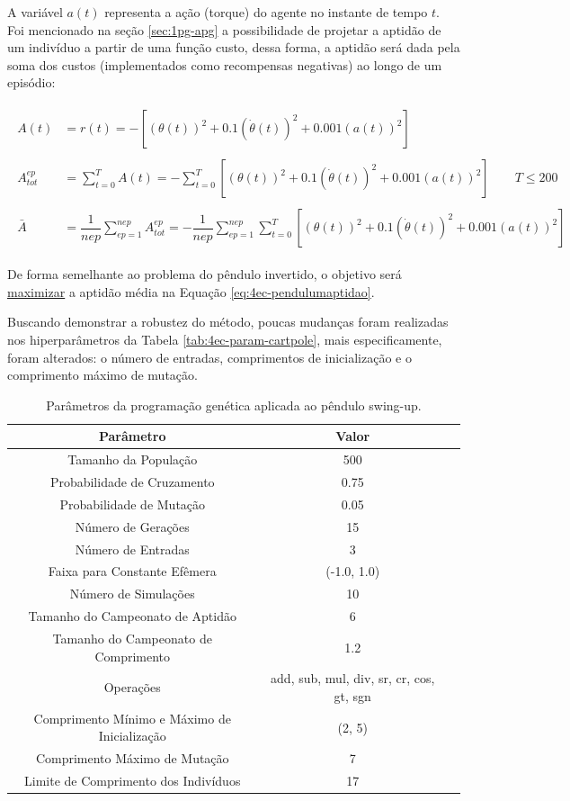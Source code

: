 A variável $a(t)$ representa a ação (torque) do agente no instante de tempo $t$. Foi mencionado na seção \ref{sec:1pg-apg} a possibilidade de projetar a aptidão de um indivíduo a partir de uma função custo, dessa forma, a aptidão será dada pela soma dos custos (implementados como recompensas negativas) ao longo de um episódio:

\begin{align}\label{eq:4ec-pendulumaptidao}
	\begin{split}
		A(t) &= r(t) = - \left[(\theta(t))^2 + 0.1(\dot\theta(t))^2+0.001(a(t))^2\right]\\\\
		A_{tot}^{ep} &= \sum_{t=0}^{T} A(t) = - \sum_{t=0}^{T} \left[
		(\theta(t))^2 + 0.1(\dot\theta(t))^2+0.001(a(t))^2
		\right]\qquad T \le 200\\\\
		\bar{A} &= \dfrac{1}{nep}\sum_{ep=1}^{nep} A_{tot}^{ep} = 
		-\dfrac{1}{nep}\sum_{ep=1}^{nep}\sum_{t=0}^{T} \left[
		(\theta(t))^2 + 0.1(\dot\theta(t))^2+0.001(a(t))^2
		\right]
	\end{split}
\end{align}

De forma semelhante ao problema do pêndulo invertido, o objetivo será \underline{maximizar} a aptidão média na Equação \ref{eq:4ec-pendulumaptidao}. 

Buscando demonstrar a robustez do método, poucas mudanças foram realizadas nos hiperparâmetros da Tabela \ref{tab:4ec-param-cartpole}, mais especificamente, foram alterados: o número de entradas, comprimentos de inicialização e o comprimento máximo de mutação. 

\begin{table}[H]
	\centering
	\begin{tabular}{SSS} \toprule
		{Parâmetro} & {Valor} \\ \midrule
		{Tamanho da População} & {500} \\
		{Probabilidade de Cruzamento} & {0.75} \\
		{Probabilidade de Mutação} & {0.05} \\
		{Número de Gerações} & {15} \\
		{Número de Entradas} & {3} \\
		{Faixa para Constante Efêmera} & {(-1.0, 1.0)} \\
		{Número de Simulações} & {10} \\
		{Tamanho do Campeonato de Aptidão} & {6} \\
		{Tamanho do Campeonato de Comprimento} & {1.2} \\
		{Operações} & {add, sub, mul, div, sr, cr, cos, gt, sgn} \\
		{Comprimento Mínimo e Máximo de Inicialização} & {(2, 5)} \\
		{Comprimento Máximo de Mutação} & {7} \\
		{Limite de Comprimento dos Indivíduos} & {17} \\
		\bottomrule
	\end{tabular}
	\caption{Parâmetros da programação genética aplicada ao pêndulo swing-up.}\label{tab:4ec-pendulumparam}
\end{table}

